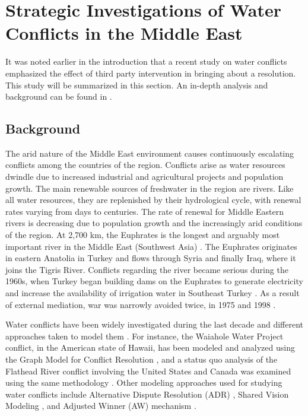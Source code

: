 \documentclass[letterpaper,12pt,titlepage,oneside,final]{book}
\begin{document}

\chapter{Strategic Investigations of Water Conflicts in the Middle East}
\label{sec:example1}
It was noted earlier in the introduction that a recent study on water conflicts emphasized the effect of third party intervention in bringing about a resolution. This study will be summarized in this section. An in-depth analysis and background can be found in \citet{HipelRami}.

\section{Background}
The arid nature of the Middle East environment causes continuously escalating conflicts among the countries of the region. Conflicts arise as water resources dwindle due to increased industrial and agricultural projects and population growth. The main renewable sources of freshwater in the region are rivers. Like all water resources, they are replenished by their hydrological cycle, with renewal rates varying from days to centuries. The rate of renewal for Middle Eastern rivers is decreasing due to population growth and the increasingly arid conditions of the region. At 2,700 km, the Euphrates is the longest and arguably most important river in the Middle East (Southwest Asia) \citep{kolars1991euphrates}.
The Euphrates originates in eastern Anatolia in Turkey and flows through Syria and finally Iraq, where it joins the Tigris River. Conflicts regarding the river became serious during the 1960s, when Turkey began building dams on the Euphrates to generate electricity and increase the availability of irrigation water in Southeast Turkey \citep{akanda2007tigris}. As a result of external mediation, war was narrowly avoided twice, in 1975 and 1998 \citep{akanda2007tigris}.

Water conflicts have been widely investigated during the last decade \citep{dinar2004exploring} and different approaches taken to model them \citep{madani2010game}. For instance, the Waiahole Water Project conflict, in the American state of Hawaii,  has been modeled and analyzed using the Graph Model for Conflict Resolution \citep{gopalakrishnan2005water}, and a status quo analysis of the Flathead River conflict involving the United States and Canada was examined using the same methodology \citep{Li2004flathead}. Other modeling approaches used for studying water conflicts include Alternative Dispute Resolution (ADR) \citep{wolf2000indigenous}, Shared Vision Modeling \citep{lund1997water}, and Adjusted Winner (AW) mechanism \citep{massoud2000fair}.
\end{document}
